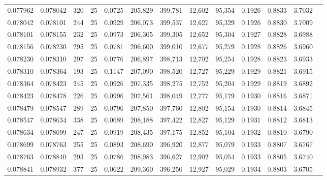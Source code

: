 \begin{tabular}{rrrrrrrrrrrrr}
0.077962 & 0.078042 &   320 &  25 &                                     0.0725 & 205,829 & 399,781 &  12,602 &  95,354 & 0.1926 & 0.8833 & 3.7032 \\
0.078042 & 0.078101 &   244 &  25 &                                     0.0929 & 206,073 & 399,537 &  12,627 &  95,329 & 0.1926 & 0.8830 & 3.7009 \\
0.078101 & 0.078155 &   232 &  25 &                                     0.0973 & 206,305 & 399,305 &  12,652 &  95,304 & 0.1927 & 0.8828 & 3.6988 \\
0.078156 & 0.078230 &   295 &  25 &                                     0.0781 & 206,600 & 399,010 &  12,677 &  95,279 & 0.1928 & 0.8826 & 3.6960 \\
0.078230 & 0.078310 &   297 &  25 &                                     0.0776 & 206,897 & 398,713 &  12,702 &  95,254 & 0.1928 & 0.8823 & 3.6933 \\
0.078310 & 0.078364 &   193 &  25 &                                     0.1147 & 207,090 & 398,520 &  12,727 &  95,229 & 0.1929 & 0.8821 & 3.6915 \\
0.078364 & 0.078423 &   245 &  25 &                                     0.0926 & 207,335 & 398,275 &  12,752 &  95,204 & 0.1929 & 0.8819 & 3.6892 \\
0.078423 & 0.078478 &   226 &  25 &                                     0.0996 & 207,561 & 398,049 &  12,777 &  95,179 & 0.1930 & 0.8816 & 3.6871 \\
0.078479 & 0.078547 &   289 &  25 &                                     0.0796 & 207,850 & 397,760 &  12,802 &  95,154 & 0.1930 & 0.8814 & 3.6845 \\
0.078547 & 0.078634 &   338 &  25 &                                     0.0689 & 208,188 & 397,422 &  12,827 &  95,129 & 0.1931 & 0.8812 & 3.6813 \\
0.078634 & 0.078699 &   247 &  25 &                                     0.0919 & 208,435 & 397,175 &  12,852 &  95,104 & 0.1932 & 0.8810 & 3.6790 \\
0.078699 & 0.078763 &   255 &  25 &                                     0.0893 & 208,690 & 396,920 &  12,877 &  95,079 & 0.1933 & 0.8807 & 3.6767 \\
0.078763 & 0.078840 &   293 &  25 &                                     0.0786 & 208,983 & 396,627 &  12,902 &  95,054 & 0.1933 & 0.8805 & 3.6740 \\
0.078841 & 0.078932 &   377 &  25 &                                     0.0622 & 209,360 & 396,250 &  12,927 &  95,029 & 0.1934 & 0.8803 & 3.6705 \\

\end{tabular}
